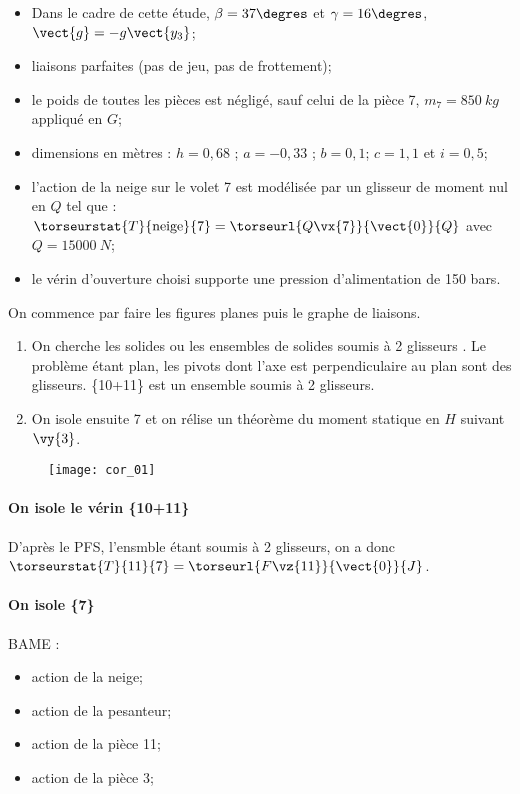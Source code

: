 \begin{itemize}
\item Dans le cadre de cette étude, $\beta = 37\degres$ et $\gamma = 16\degres$, $\vect{g}=-g\vect{y_3}$;
\item liaisons parfaites (pas de jeu, pas de frottement);
\item le poids de toutes les pièces est négligé, sauf celui de la pièce 7, $m_7=\SI{850}{kg}$ appliqué en $G$;
\item dimensions en mètres :  $h=0,68$ ; $a=-0,33$ ; $b=0,1$; $c=1,1$ et $i=0,5$;
\item l’action de la neige sur le volet 7 est modélisée par un glisseur de moment nul en $Q$ tel que :
$\torseurstat{T}{\text{neige}}{7} =  \torseurl{Q\vx{7}}{\vect{0}}{Q}$ avec $Q = \SI{15000}{N}$;
\item le vérin d’ouverture choisi supporte une pression d'alimentation de 150 bars.
\end{itemize}





On commence par faire les figures planes puis le graphe de liaisons.
\begin{enumerate}
\item On cherche les solides ou les ensembles de solides soumis à 2 glisseurs . Le problème étant plan, les pivots dont l'axe est perpendiculaire au plan sont des glisseurs. \{10+11\} est un ensemble soumis à 2 glisseurs.
\item On isole ensuite 7 et on rélise un théorème du moment statique en $H$ suivant $\vy{3}$.
\end{enumerate}

\begin{figure*}[!h]
\texttt{[image: cor\_01]}
\end{figure*}

\paragraph*{On isole le vérin \{10+11\}}
D'après le PFS, l'ensmble étant soumis à 2 glisseurs, on a donc $\torseurstat{T}{11}{7} = \torseurl{F\vz{11}}{\vect{0}}{J}$.

\paragraph*{On isole \{7\}}
BAME : 
\begin{itemize}
\item action de la neige;
\item action de la pesanteur;
\item action de la pièce 11;
\item action de la pièce 3;
\end{itemize}

